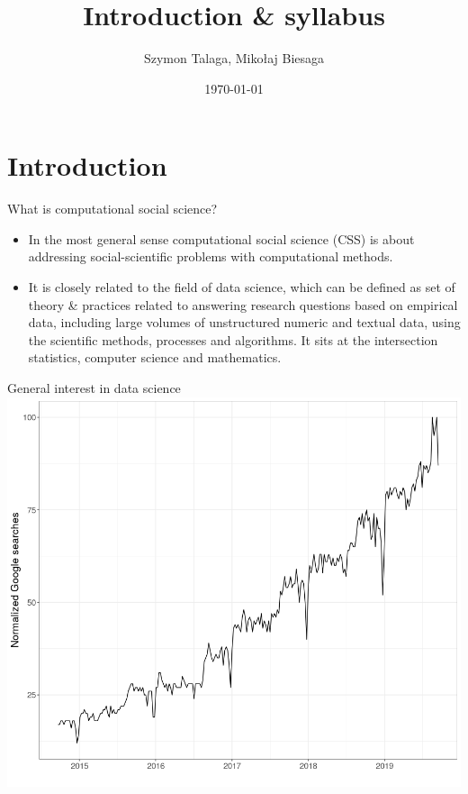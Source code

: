 
\title[Introduction \& syllabus]{
    Introduction \& syllabus \\
    \small{}
}
\author{Szymon Talaga, Mikołaj Biesaga} %
\date{\today} %

\frame{\titlepage}

\section{Introduction}

\begin{frame}{What is computational social science?}
\begin{itemize}
    \item In the most general sense computational social science (CSS)
    is about addressing social-scientific problems with computational methods.
    \item It is closely related to the field of data science, which can be
    defined as set of theory \& practices related to answering research questions
    based on empirical data, including large volumes of unstructured numeric
    and textual data, using the scientific methods, processes and algorithms.
    It sits at the intersection statistics, computer science and mathematics.
\end{itemize}
\end{frame}

\begin{frame}{General interest in data science}
    \includegraphics[width=\framewidth]{ds-searches.png}
\end{frame}

